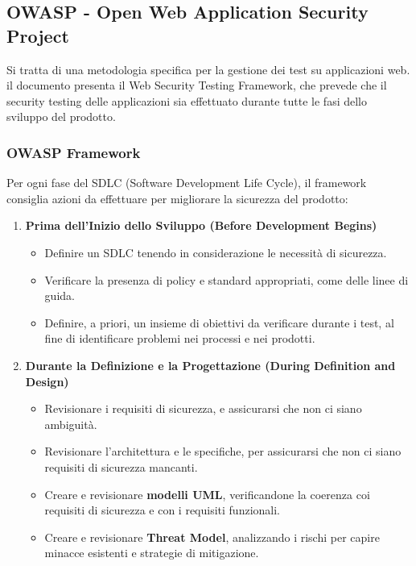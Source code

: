 \documentclass{article}
\begin{document}
\subsection{OWASP - Open Web Application Security Project}
Si tratta di una metodologia specifica per la gestione dei test su applicazioni web. il documento presenta il Web Security Testing Framework, 
che prevede che il security testing delle applicazioni sia effettuato durante tutte le fasi dello sviluppo del prodotto.

\subsubsection{OWASP Framework}
Per ogni fase del SDLC (Software Development Life Cycle), il framework consiglia azioni da effettuare per migliorare la sicurezza del prodotto:
\begin{enumerate}
    \item \textbf{Prima dell’Inizio dello Sviluppo (Before Development Begins)}
    \begin{itemize}
        \item Definire un SDLC tenendo in considerazione le necessità di sicurezza.

        \item Verificare la presenza di policy e standard appropriati, come delle linee di guida.

        \item  Definire, a priori, un insieme di obiettivi da verificare durante i test, al fine di identificare problemi nei processi e nei 
        prodotti.
    \end{itemize}

    \item \textbf{Durante la Definizione e la Progettazione (During Definition and Design)}
    \begin{itemize}
        \item Revisionare i requisiti di sicurezza, e assicurarsi che non ci siano ambiguità.

        \item Revisionare l’architettura e le specifiche, per assicurarsi che non ci siano requisiti di sicurezza mancanti.

        \item  Creare e revisionare \textbf{modelli UML}, verificandone la coerenza coi requisiti di sicurezza e con i requisiti funzionali.

        \item Creare e revisionare \textbf{Threat Model}, analizzando i rischi per capire minacce esistenti e strategie di mitigazione.
    \end{itemize}


\end{enumerate}
\end{document}
